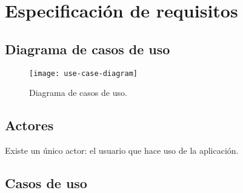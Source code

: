 \newpage

\section{Especificación de requisitos}

\subsection{Diagrama de casos de uso}

\begin{figure}[h!]
	\centering
	\texttt{[image: use-case-diagram]}
	\vspace{-0.5cm}
	\caption{Diagrama de casos de uso.}
	\label{flutter-widgets}
\end{figure}

\subsection{Actores}

Existe un único actor: el usuario que hace uso de la aplicación.


\subsection{Casos de uso}

